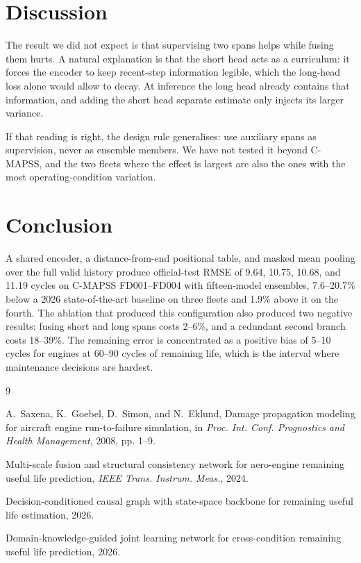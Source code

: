 \documentclass[journal,10pt]{IEEEtran}
\begin{document}
\section{Discussion}

The result we did not expect is that supervising two spans helps while fusing them
hurts. A natural explanation is that the short head acts as a curriculum: it forces
the encoder to keep recent-step information legible, which the long-head loss alone
would allow to decay. At inference the long head already contains that information,
and adding the short head separate estimate only injects its larger variance.

If that reading is right, the design rule generalises: use auxiliary spans as
supervision, never as ensemble members. We have not tested it beyond C-MAPSS, and
the two fleets where the effect is largest are also the ones with the most
operating-condition variation.

\section{Conclusion}

A shared encoder, a distance-from-end positional table, and masked mean pooling
over the full valid history produce official-test RMSE of 9.64, 10.75, 10.68, and
11.19 cycles on C-MAPSS FD001--FD004 with fifteen-model ensembles, 7.6--20.7\% below
a 2026 state-of-the-art baseline on three fleets and 1.9\% above it on the fourth.
The ablation that produced this configuration also produced two negative results:
fusing short and long spans costs 2--6\%, and a redundant second branch costs
18--39\%. The remaining error is concentrated as a positive bias of 5--10 cycles for
engines at 60--90 cycles of remaining life, which is the interval where maintenance
decisions are hardest.

\begin{thebibliography}{9}

A.~Saxena, K.~Goebel, D.~Simon, and N.~Eklund, Damage propagation modeling for
aircraft engine run-to-failure simulation, in \emph{Proc. Int. Conf. Prognostics}
\emph{and Health Management}, 2008, pp. 1--9.

Multi-scale fusion and structural consistency network for aero-engine remaining
useful life prediction, \emph{IEEE Trans. Instrum. Meas.}, 2024.

Decision-conditioned causal graph with state-space backbone for remaining useful
life estimation, 2026.

Domain-knowledge-guided joint learning network for cross-condition remaining useful
life prediction, 2026.

\end{thebibliography}
\end{document}
